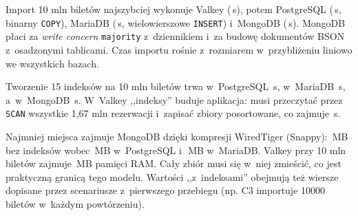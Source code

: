 Import 10 mln biletów najszybciej wykonuje Valkey
(\,s), potem PostgreSQL
(\,s, binarny \texttt{COPY}), MariaDB
(\,s, wielowierszowe \texttt{INSERT}) i~MongoDB
(\,s). MongoDB płaci za \emph{write concern}
\texttt{majority} z~dziennikiem i~za budowę dokumentów BSON z~osadzonymi
tablicami. Czas importu rośnie z~rozmiarem w~przybliżeniu liniowo we
wszystkich bazach.

Tworzenie 15 indeksów na 10 mln biletów trwa w~PostgreSQL
\,s, w~MariaDB
\,s, a~w~MongoDB
\,s. W~Valkey ,,indeksy'' buduje aplikacja:
musi przeczytać przez \texttt{SCAN} wszystkie 1,67 mln rezerwacji i~zapisać
zbiory posortowane, co zajmuje \,s.

Najmniej miejsca zajmuje MongoDB dzięki kompresji WiredTiger (Snappy):
\,MB bez indeksów wobec
\,MB w~PostgreSQL i~\,MB
w~MariaDB. Valkey przy 10 mln biletów zajmuje \,MB
pamięci RAM. Cały zbiór musi się w~niej zmieścić, co jest praktyczną granicą
tego modelu. Wartości ,,z~indeksami'' obejmują też wiersze dopisane przez
scenariusze z~pierwszego przebiegu (np. C3 importuje \num{10000} biletów
w~każdym powtórzeniu).
